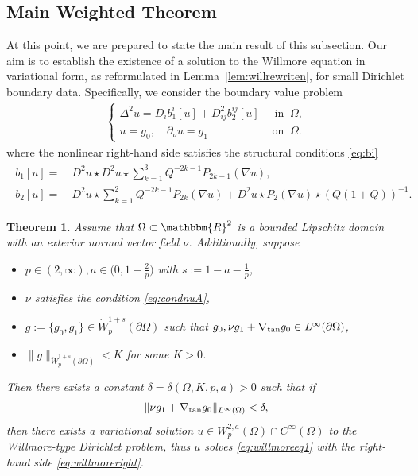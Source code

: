 \documentclass[12pt,a4paper,twoside]{article}
\newcommand{\R}{\mathbbm {R}}
\newtheorem{thm}{Theorem}
\begin{document}
\subsection{Main Weighted Theorem}
\label{subsec:mainweighted}

At this point, we are prepared to state the main result of this subsection. Our aim is to establish the existence of a solution to the Willmore equation in variational form, as reformulated in Lemma~\ref{lem:willrewriten}, for small Dirichlet boundary data. Specifically, we consider the boundary value problem
\begin{align}
\begin{cases}
\Delta^2 u = D_{i} b^{i}_1[u] + D^2_{ij} b^{ij}_2[u] &\ \text{ in }  \ \Omega, \\
u= g_0, \quad  \partial_\nu u =  g_1 &\text{ on } \  \Omega.
\end{cases}    \label{eq:willmoreeq1}
\end{align}
where the nonlinear right-hand side satisfies the structural conditions \eqref{eq:bi} 
\begin{align}
\begin{aligned}
b_1[u] =&\ D^2 u \star D^2 u \star \sum_{k=1}^3 Q^{-2k-1}P_{2k-1}(\nabla u),   \\
    b_2[u]=&\ D^2 u \star \sum_{k=1}^2 Q^{-2k-1}P_{2k}(\nabla u) + D^2 u \star P_2 (\nabla u) \star (Q(1+Q))^{-1}. 
\end{aligned}  \label{eq:willmoreright}
\end{align}

\begin{thm}\label{thm:wlpexistweight}
Assume that $\Omega\subset \R^2$ is a bounded Lipschitz domain with an exterior normal vector field $\nu$. Additionally, suppose
\begin{itemize}
    \item  $p\in(2,\infty), a\in \Big(0,1-\frac{2}{p}\Big)$ with $s:=1-a-\frac{1}{p}$,
    \item $\nu$ satisfies the condition \eqref{eq:condnuA},
    \item $g:=\{g_0,g_1\}\in \dot W^{1+s}_p(\partial\Omega)$ such that $g_0, \nu g_1+\nabla_{\rm tan} g_0\in L^{\infty}(\partial\Omega)$,
    \item $\|g\|_{\dot W^{1+s}_p(\partial\Omega)} <K$ for some $K>0$.
\end{itemize}

Then there exists a constant $\delta=\delta(\Omega,K,p,a)>0$ such that if 
\begin{align*}
    \|\nu g_1+\nabla_{\rm tan} g_0\|_{L^\infty(\Omega)}<\delta,
\end{align*}
then there exists a variational solution $u\in {W^{2,a}_p(\Omega)}\cap C^\infty(\Omega)$ to the Willmore-type Dirichlet problem, thus $u$ solves \eqref{eq:willmoreeq1} with the right-hand side \eqref{eq:willmoreright}.
\end{thm}
\end{document}
